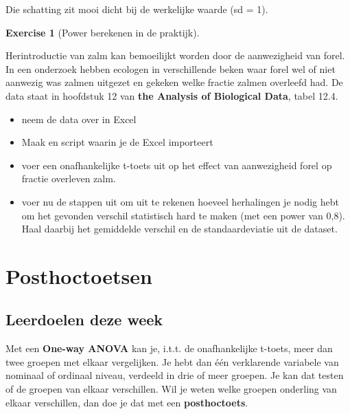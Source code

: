 \documentclass[
  letterpaper,
  DIV=11,
  numbers=noendperiod]{scrreprt}
\providecommand{\tightlist}{%
  \setlength{\itemsep}{0pt}\setlength{\parskip}{0pt}}\usepackage{longtable,booktabs,array}
\theoremstyle{definition}
\newtheorem{exercise}{Exercise}[chapter]
\theoremstyle{remark}
\begin{document}
Die schatting zit mooi dicht bij de werkelijke waarde (sd = 1).

\leavevmode{}%
\begin{exercise}[Power berekenen in de
praktijk]\label{exr-powerberekenen2}

Herintroductie van zalm kan bemoeilijkt worden door de aanwezigheid van
forel. In een onderzoek hebben ecologen in verschillende beken waar
forel wel of niet aanwezig was zalmen uitgezet en gekeken welke fractie
zalmen overleefd had. De data staat in hoofdstuk 12 van \textbf{the
Analysis of Biological Data}, tabel 12.4.

\begin{itemize}
\tightlist
\item
  neem de data over in Excel
\item
  Maak en script waarin je de Excel importeert
\item
  voer een onafhankelijke t-toets uit op het effect van aanwezigheid
  forel op fractie overleven zalm.
\item
  voer nu de stappen uit om uit te rekenen hoeveel herhalingen je nodig
  hebt om het gevonden verschil statistisch hard te maken (met een power
  van 0,8). Haal daarbij het gemiddelde verschil en de standaardeviatie
  uit de dataset.
\end{itemize}

\end{exercise}


\hypertarget{posthoctoetsen}{%
\chapter{Posthoctoetsen}\label{posthoctoetsen}}

\hypertarget{leerdoelen-deze-week}{%
\section{Leerdoelen deze week}\label{leerdoelen-deze-week}}

Met een \textbf{One-way ANOVA} kan je, i.t.t. de onafhankelijke t-toets,
meer dan twee groepen met elkaar vergelijken. Je hebt dan één
verklarende variabele van nominaal of ordinaal niveau, verdeeld in drie
of meer groepen. Je kan dat testen of de groepen van elkaar verschillen.
Wil je weten welke groepen onderling van elkaar verschillen, dan doe je
dat met een \textbf{posthoctoets}.
\end{document}
